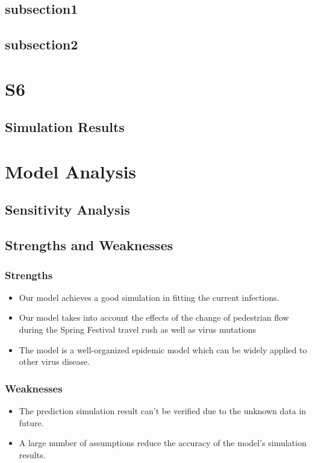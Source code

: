 \documentclass{mcmthesis}
\begin{document}
    
\subsection{subsection1}\label{S5s1}
    

\subsection{subsection2}\label{S5s2}
	
 
\section{S6}\label{S6}
   
	
\subsection{Simulation Results}
    


\section{Model Analysis}\label{S7}

\subsection{Sensitivity Analysis}


\subsection{Strengths and Weaknesses}
\subsubsection{Strengths}
\begin{itemize}
	\item Our model achieves a good simulation in fitting the current infections.
	\item Our model takes into account the effects of the change of pedestrian flow during the Spring Festival travel rush as well as virus mutations
	\item The model is a well-organized epidemic model which can be widely applied to other virus disease.
\end{itemize}
\subsubsection{Weaknesses}
\begin{itemize}
	\item The prediction simulation result can't be verified due to the unknown data in future.  
	\item A large number of assumptions reduce the accuracy of the model’s simulation results.
\end{itemize}
\end{document}
